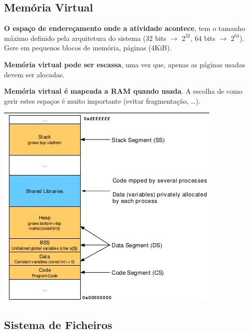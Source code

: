 \documentclass{article}
\begin{document}
\subsection{Memória Virtual}

\begin{flushleft}
  \textbf{O espaço de endereçamento onde a atividade acontece}, tem o tamanho
  máximo definido pela arquitetura do sistema (32 bits $\rightarrow$ $2^{32}$,
  64 bits $\rightarrow$ $2^{64}$). Gere em pequenos blocos de memória, páginas
  (4KiB).

  \vspace{2mm}

  \textbf{Memória virtual pode ser escassa}, uma vez que, apenas as páginas
  usadas devem ser alocadas.

  \pagebreak

  \textbf{Memória virtual é mapeada a RAM quando usada}. A escolha de como
  gerir estes espaços é muito importante (evitar fragmentação, \dots).
\end{flushleft}

\begin{center}
  \includegraphics[scale=0.4]{30}
\end{center}

\subsection{Sistema de Ficheiros}
\end{document}

